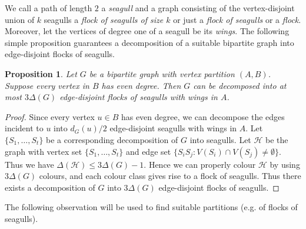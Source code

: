 \documentclass[a4paper, 11pt, reqno]{amsart}
\newtheorem{proposition}[definition]{Proposition}
\numberwithin{equation}{section}
\newcommand{\1}{{\rm 1\hspace*{-0.4ex}%
\rule{0.1ex}{1.52ex}\hspace*{0.2ex}}}
\newcommand{\cH}{\mathcal{H}}
\newcommand{\COMMENT}[1]{}
\begin{document}
We call a path of length $2$ a \emph{seagull}
and a graph consisting of the vertex-disjoint union of $k$ seagulls a \emph{flock of seagulls of size $k$}
or just a \emph{flock of seagulls} or a \emph{flock}.
Moreover, let the vertices of degree one of a seagull be its \emph{wings}. The following simple proposition guarantees a decomposition of a suitable bipartite graph into edge-disjoint flocks of seagulls.

\begin{proposition}\label{prop: bip seagull}
Let $G$ be a bipartite graph with vertex partition $(A,B)$.
Suppose every vertex in $B$ has even degree.
Then $G$ can be decomposed into at most $3\Delta(G)$ edge-disjoint flocks of seagulls with wings in $A$.
\end{proposition}
\begin{proof}
Since every vertex $u\in B$ has even degree, 
we can decompose the edges incident to $u$ into $d_{G}(u)/2$ edge-disjoint seagulls with wings in $A$. 
Let $\{S_1,\dots, S_t\}$ be a corresponding decomposition of $G$ into seagulls.
Let $\cH$ be the graph with vertex set $\{S_1,\dots, S_t\}$ and edge set $\{S_iS_j: V(S_i)\cap V(S_j)\neq \emptyset\}$. 
Thus we have $\Delta(\cH) \leq 3\Delta(G)-1$.\COMMENT{Actually, $5\Delta(G)/2-3$.} %
Hence we can properly colour $\cH$ by using $3\Delta(G)$ colours, and each colour class gives rise to a flock of seagulls.
Thus there exists a decomposition of $G$ into $3\Delta(G)$ edge-disjoint flocks of seagulls.
\end{proof}

The following observation will be used to find suitable partitions (e.g. of flocks of seagulls).
\end{document}

